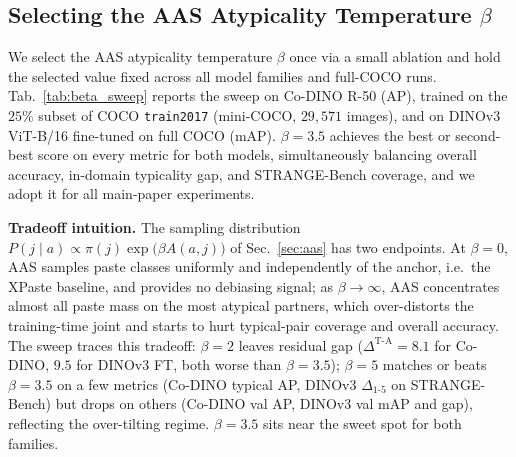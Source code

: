 \subsection{Selecting the AAS Atypicality Temperature \texorpdfstring{$\beta$}{β}}
\label{app:beta_sweep}

We select the AAS atypicality temperature $\beta$ once via a small ablation and hold the selected value fixed across all model families and full-COCO runs. Tab.~\ref{tab:beta_sweep} reports the sweep on Co-DINO \mbox{R-50} (AP), trained on the $25\%$ subset of COCO \texttt{train2017} (mini-COCO, $29{,}571$ images), and on DINOv3 ViT-B/16 fine-tuned on full COCO (mAP). 
$\beta = 3.5$ achieves the best or second-best score on every metric for both models, simultaneously balancing overall accuracy, in-domain typicality gap, and STRANGE-Bench coverage, and we adopt it for all main-paper experiments. 

\noindent\textbf{Tradeoff intuition.}
The sampling distribution $P(j \mid a) \propto \pi(j) \exp\big(\beta A(a, j)\big)$ of Sec.~\ref{sec:aas} has two endpoints. At $\beta = 0$, AAS samples paste classes uniformly and independently of the anchor, i.e.\ the XPaste baseline, and provides no debiasing signal; as $\beta \to \infty$, AAS concentrates almost all paste mass on the most atypical partners, which over-distorts the training-time joint and starts to hurt typical-pair coverage and overall accuracy. The sweep traces this tradeoff: $\beta = 2$ leaves residual gap ($\Delta^{\text{T-A}} = 8.1$ for Co-DINO, $9.5$ for DINOv3 FT, both worse than $\beta = 3.5$); $\beta = 5$ matches or beats $\beta = 3.5$ on a few metrics (Co-DINO typical AP, DINOv3 $\Delta_{1\text{-}5}$ on STRANGE-Bench) but drops on others (Co-DINO val AP, DINOv3 val mAP and gap), reflecting the over-tilting regime. $\beta = 3.5$ sits near the sweet spot for both families.

